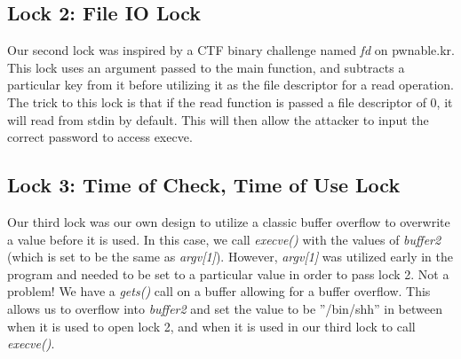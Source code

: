 \subsection{Lock 2: File IO Lock}
Our second lock was inspired by a CTF binary challenge named \emph{fd} on pwnable.kr. This lock uses an argument passed to the main function, and subtracts a particular key from it before utilizing it as the file descriptor for a read operation. The trick to this lock is that if the read function is passed a file descriptor of 0, it will read from stdin by default. This will then allow the attacker to input the correct password to access execve.

\subsection{Lock 3: Time of Check, Time of Use Lock}
Our third lock was our own design to utilize a classic buffer overflow to overwrite a value before it is used. In this case, we call \emph{execve()} with the values of \emph{buffer2} (which is set to be the same as \emph{argv[1]}). However, \emph{argv[1]} was utilized early in the program and needed to be set to a particular value in order to pass lock 2. Not a problem! We have a \emph{gets()} call on a buffer allowing for a buffer overflow. This allows us to overflow into \emph{buffer2} and set the value to be ''/bin/shh'' in between when it is used to open lock 2, and when it is used in our third lock to call \emph{execve()}. 
